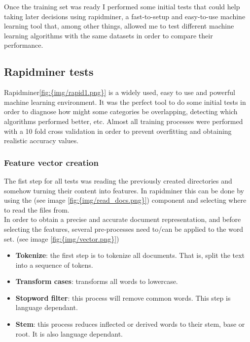 Once the training set was ready I performed some initial tests that could help taking later decisions using rapidminer\cite{rapidminer}, a fast-to-setup and easy-to-use machine learning tool that, 
among other things, allowed me to test different machine learning algorithms with the same datasets in order to compare their performance. 

  

\subsection{Rapidminer tests}
Rapidminer\cite{rapidminer}\ref{fig:{img/rapid1.png}} is a widely used, easy to use and powerful machine learning environment.  
It was the perfect tool to do some initial tests in order to diagnose how might some categories be overlapping, detecting which algorithms performed better, etc. Almost all training processes were 
performed with a 10 fold cross validation in order to prevent overfitting and obtaining realistic accuracy values.

\subsubsection{Feature vector creation}
The fist step for all tests was reading the previously created directories and somehow turning their content into features. In rapidminer this can be done by using the 
 (see image \ref{fig:{img/read_docs.png}})
component and selecting where to read the files from.\\
In order to obtain a precise and accurate document representation, and before selecting the features, several pre-processes need to/can be applied to the word set. (see image \ref{fig:{img/vector.png}})
\begin{itemize}
  \item {\bf Tokenize}: the first step is to tokenize all documents. That is, split the text into a sequence of tokens. 
  \item {\bf Transform cases}: transforms all words to lowercase.
  \item {\bf Stopword filter}: this process will remove common words. This step is language dependant.
  \item {\bf Stem}: this process reduces inflected or derived words to their stem, base or root. It is also language dependant.
\end{itemize}


